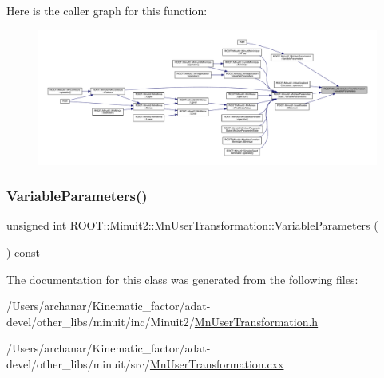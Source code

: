 Here is the caller graph for this function\+:
\nopagebreak
\begin{figure}[H]
\begin{center}
\leavevmode
\includegraphics[width=350pt]{d9/d98/classROOT_1_1Minuit2_1_1MnUserTransformation_a6e88cb38d0d19f4cf9ed3dd8102eebef_icgraph}
\end{center}
\end{figure}
\mbox{\label{classROOT_1_1Minuit2_1_1MnUserTransformation_a6e88cb38d0d19f4cf9ed3dd8102eebef}} 
\subsubsection{\texorpdfstring{VariableParameters()}{VariableParameters()}\hspace{0.1cm}{\footnotesize\ttfamily [3/3]}}
{\footnotesize\ttfamily unsigned int R\+O\+O\+T\+::\+Minuit2\+::\+Mn\+User\+Transformation\+::\+Variable\+Parameters (\begin{DoxyParamCaption}{ }\end{DoxyParamCaption}) const\hspace{0.3cm}{\ttfamily [inline]}}



The documentation for this class was generated from the following files\+:\begin{DoxyCompactItemize}
\item 
/\+Users/archanar/\+Kinematic\+\_\+factor/adat-\/devel/other\+\_\+libs/minuit/inc/\+Minuit2/\mbox{\hyperlink{adat-devel_2other__libs_2minuit_2inc_2Minuit2_2MnUserTransformation_8h}{Mn\+User\+Transformation.\+h}}\item 
/\+Users/archanar/\+Kinematic\+\_\+factor/adat-\/devel/other\+\_\+libs/minuit/src/\mbox{\hyperlink{adat-devel_2other__libs_2minuit_2src_2MnUserTransformation_8cxx}{Mn\+User\+Transformation.\+cxx}}\end{DoxyCompactItemize}
